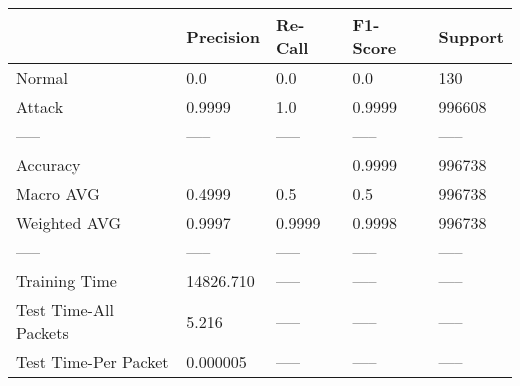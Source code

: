 \begin{tabular}{lllll}
\toprule
{} &  Precision & Re-Call & F1-Score & Support \\
\midrule
Normal                &        0.0 &     0.0 &      0.0 &     130 \\
Attack                &     0.9999 &     1.0 &   0.9999 &  996608 \\
-----                 &      ----- &   ----- &    ----- &   ----- \\
Accuracy              &            &         &   0.9999 &  996738 \\
Macro AVG             &     0.4999 &     0.5 &      0.5 &  996738 \\
Weighted AVG          &     0.9997 &  0.9999 &   0.9998 &  996738 \\
-----                 &      ----- &   ----- &    ----- &   ----- \\
Training Time         &  14826.710 &   ----- &    ----- &   ----- \\
Test Time-All Packets &      5.216 &   ----- &    ----- &   ----- \\
Test Time-Per Packet  &   0.000005 &   ----- &    ----- &   ----- \\
\bottomrule
\end{tabular}

